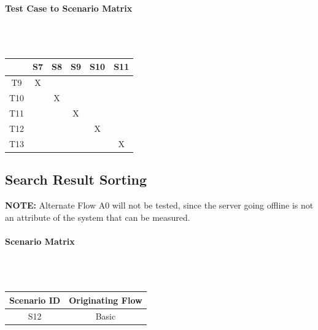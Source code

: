 \documentclass{article}
\begin{document}
\paragraph{Test Case to Scenario Matrix}~\\ \\
\begin{tabular}{ | c || c | c | c | c | c | }
\hline
    & S7  & S8  & S9  & S10 & S11 \\
\hline
\hline
T9  &  X  &     &     &     &     \\
\hline
T10 &     &  X  &     &     &     \\
\hline
T11 &     &     &  X  &     &     \\
\hline
T12 &     &     &     &  X  &     \\
\hline
T13 &     &     &     &     &  X  \\
\hline
\end{tabular}

\subsection{Search Result Sorting}
\textbf{NOTE:} Alternate Flow A0 will not be tested, since the server going offline is not an attribute of the system that can be measured.
\paragraph{Scenario Matrix}~\\ \\
\begin{tabular}{ c  c }
\hline
Scenario ID & Originating Flow\\
\hline
\hline
S12 & Basic\\
\hline
\end{tabular}\\
~\\
~\\
\end{document}
